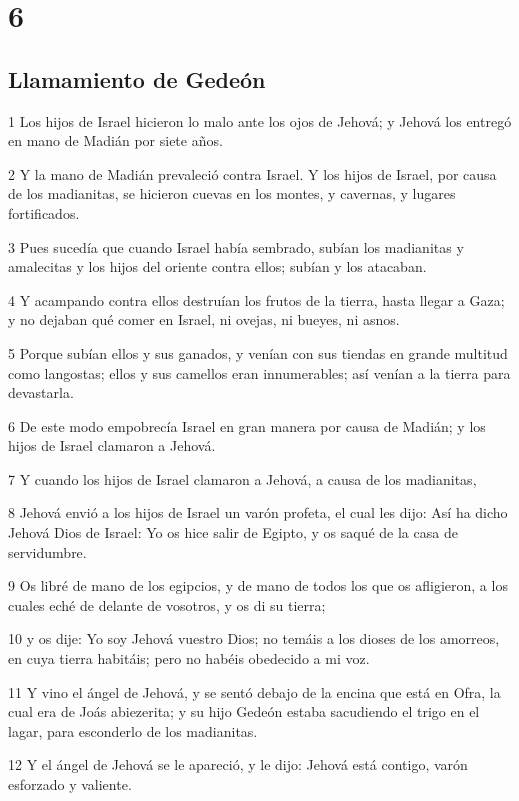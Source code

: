 \chapter{6}

\section*{Llamamiento de Gedeón}

\par 1 Los hijos de Israel hicieron lo malo ante los ojos de Jehová; y Jehová los entregó en mano de Madián por siete años.
\par 2 Y la mano de Madián prevaleció contra Israel. Y los hijos de Israel, por causa de los madianitas, se hicieron cuevas en los montes, y cavernas, y lugares fortificados.
\par 3 Pues sucedía que cuando Israel había sembrado, subían los madianitas y amalecitas y los hijos del oriente contra ellos; subían y los atacaban.
\par 4 Y acampando contra ellos destruían los frutos de la tierra, hasta llegar a Gaza; y no dejaban qué comer en Israel, ni ovejas, ni bueyes, ni asnos.
\par 5 Porque subían ellos y sus ganados, y venían con sus tiendas en grande multitud como langostas; ellos y sus camellos eran innumerables; así venían a la tierra para devastarla.
\par 6 De este modo empobrecía Israel en gran manera por causa de Madián; y los hijos de Israel clamaron a Jehová.
\par 7 Y cuando los hijos de Israel clamaron a Jehová, a causa de los madianitas,
\par 8 Jehová envió a los hijos de Israel un varón profeta, el cual les dijo: Así ha dicho Jehová Dios de Israel: Yo os hice salir de Egipto, y os saqué de la casa de servidumbre.
\par 9 Os libré de mano de los egipcios, y de mano de todos los que os afligieron, a los cuales eché de delante de vosotros, y os di su tierra;
\par 10 y os dije: Yo soy Jehová vuestro Dios; no temáis a los dioses de los amorreos, en cuya tierra habitáis; pero no habéis obedecido a mi voz.
\par 11 Y vino el ángel de Jehová, y se sentó debajo de la encina que está en Ofra, la cual era de Joás abiezerita; y su hijo Gedeón estaba sacudiendo el trigo en el lagar, para esconderlo de los madianitas.
\par 12 Y el ángel de Jehová se le apareció, y le dijo: Jehová está contigo, varón esforzado y valiente.
